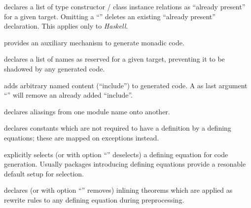 \begin{isabellebody}
\begin{isamarkuptext}
\begin{descr}
  \item [\hyperlink{command.HOL.code-instance}{\mbox{\isa{\isacommand{code{\isacharunderscore}instance}}}}] declares a list of type
  constructor / class instance relations as ``already present'' for a
  given target.  Omitting a ``\isa{{\isachardoublequote}{\isacharminus}{\isachardoublequote}}'' deletes an existing
  ``already present'' declaration.  This applies only to
  \emph{Haskell}.

  \item [\hyperlink{command.HOL.code-monad}{\mbox{\isa{\isacommand{code{\isacharunderscore}monad}}}}] provides an auxiliary
  mechanism to generate monadic code.

  \item [\hyperlink{command.HOL.code-reserved}{\mbox{\isa{\isacommand{code{\isacharunderscore}reserved}}}}] declares a list of names as
  reserved for a given target, preventing it to be shadowed by any
  generated code.

  \item [\hyperlink{command.HOL.code-include}{\mbox{\isa{\isacommand{code{\isacharunderscore}include}}}}] adds arbitrary named content
  (``include'') to generated code.  A as last argument ``\isa{{\isachardoublequote}{\isacharminus}{\isachardoublequote}}''
  will remove an already added ``include''.

  \item [\hyperlink{command.HOL.code-modulename}{\mbox{\isa{\isacommand{code{\isacharunderscore}modulename}}}}] declares aliasings from
  one module name onto another.

  \item [\hyperlink{command.HOL.code-exception}{\mbox{\isa{\isacommand{code{\isacharunderscore}exception}}}}] declares constants which
  are not required to have a definition by a defining equations; these
  are mapped on exceptions instead.

  \item [\hyperlink{attribute.HOL.code}{\mbox{\isa{code}}}~\isa{func}] explicitly selects (or
  with option ``'' deselects) a defining equation for
  code generation.  Usually packages introducing defining equations
  provide a resonable default setup for selection.

  \item [\hyperlink{attribute.HOL.code}{\mbox{\isa{code}}}\isa{inline}] declares (or with
  option ``'' removes) inlining theorems which are
  applied as rewrite rules to any defining equation during
  preprocessing.


\end{descr}
\end{isamarkuptext}
\end{isabellebody}
